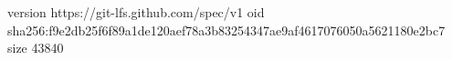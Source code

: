 version https://git-lfs.github.com/spec/v1
oid sha256:f9e2db25f6f89a1de120aef78a3b83254347ae9af4617076050a5621180e2bc7
size 43840
